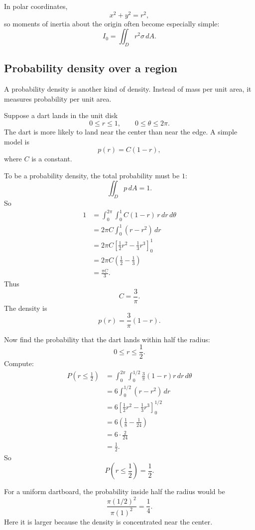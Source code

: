 In polar coordinates,
\[
    x^2+y^2=r^2,
\]
so moments of inertia about the origin often become especially simple:
\[
    I_0=\iint_D r^2\sigma\,dA.
\]

\subsection{Probability density over a region}

A probability density is another kind of density.  Instead of mass per unit area, it
measures probability per unit area.

Suppose a dart lands in the unit disk
\[
    0\le r\le1,
    \qquad
    0\le\theta\le2\pi.
\]
The dart is more likely to land near the center than near the edge.  A simple model is
\[
    p(r)=C(1-r),
\]
where \(C\) is a constant.

To be a probability density, the total probability must be \(1\):
\[
    \iint_D p\,dA=1.
\]
So
\[
\begin{aligned}
    1
    &=
    \int_0^{2\pi}\int_0^1 C(1-r)\,r\,dr\,d\theta\\
    &=
    2\pi C\int_0^1(r-r^2)\,dr\\
    &=
    2\pi C
    \left[
        \frac12r^2-\frac13r^3
    \right]_0^1\\
    &=
    2\pi C\left(\frac12-\frac13\right)\\
    &=
    \frac{\pi C}{3}.
\end{aligned}
\]
Thus
\[
    C=\frac{3}{\pi}.
\]
The density is
\[
    p(r)=\frac{3}{\pi}(1-r).
\]

Now find the probability that the dart lands within half the radius:
\[
    0\le r\le\frac12.
\]
Compute:
\[
\begin{aligned}
    P\left(r\le\frac12\right)
    &=
    \int_0^{2\pi}
    \int_0^{1/2}
    \frac{3}{\pi}(1-r)r\,dr\,d\theta\\
    &=
    6\int_0^{1/2}(r-r^2)\,dr\\
    &=
    6\left[
        \frac12r^2-\frac13r^3
    \right]_0^{1/2}\\
    &=
    6\left(
        \frac18-\frac1{24}
    \right)\\
    &=
    6\cdot\frac{2}{24}\\
    &=
    \frac12.
\end{aligned}
\]
So
\[
\boxed{
    P\left(r\le\frac12\right)=\frac12.
}
\]

For a uniform dartboard, the probability inside half the radius would be
\[
    \frac{\pi(1/2)^2}{\pi(1)^2}=\frac14.
\]
Here it is larger because the density is concentrated near the center.


